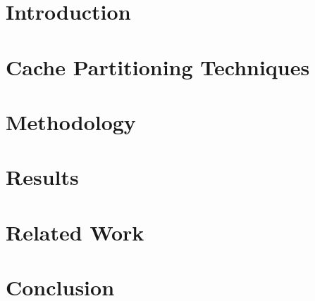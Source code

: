 \section{Introduction}


\section{Cache Partitioning Techniques}


\section{Methodology}


\section{Results}


\section{Related Work}


\section{Conclusion}
